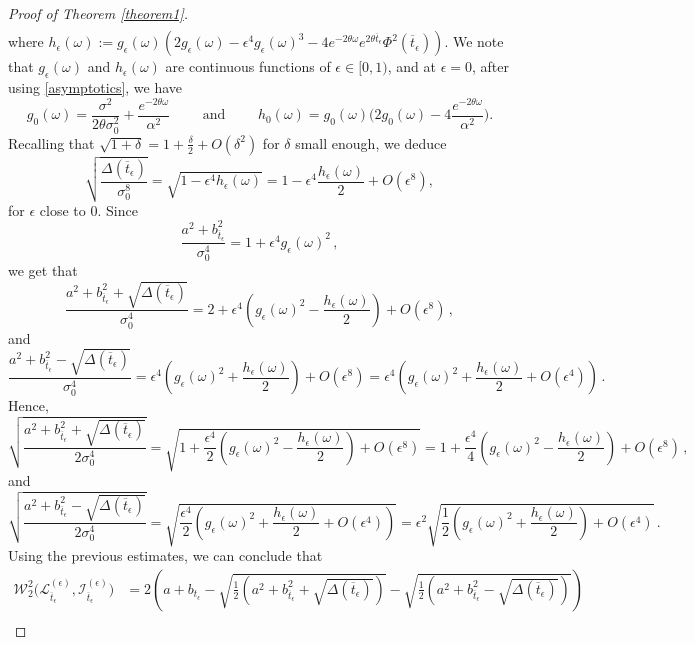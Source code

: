 \documentclass[12pt,thmsa]{article}
\begin{document}
\begin{proof}[Proof of Theorem \ref{theorem1}]
\[\begin{split}
	\end{split}
	\]
	where $h_\epsilon(\omega):=g_\epsilon(\omega)(2g_\epsilon(\omega)-\epsilon^4 g_\epsilon(\omega)^3-4 e^{-2\theta \omega}e^{2\theta \overline{t}_\epsilon}\Phi^2(\overline{t}_\epsilon))$.
	We note that $g_\epsilon(\omega)$ and $h_\epsilon(\omega)$ are continuous functions of $\epsilon\in[0,1)$, and at $\epsilon=0$, after using \eqref{asymptotics},  we have
	\begin{equation}\label{zero}
		g_0(\omega)=\frac{\sigma^2}{2\theta\sigma_0^2}+ \frac{e^{-2\theta \omega}}{\alpha^2}\qquad\mbox{ and }\qquad h_0(\omega)=g_0(\omega)\Big(2g_0(\omega)-4 \frac{e^{-2\theta \omega}}{\alpha^2}\Big).
	\end{equation}
	Recalling that $\sqrt{1+\delta}=1+\frac{\delta}{2}+O(\delta^2)$ for $\delta$ small enough, we deduce
	$$\sqrt{\frac{\Delta(\overline{t}_\epsilon)}{\sigma_0^8}}=\sqrt{1-\epsilon^4 h_\epsilon(\omega)}=1-\epsilon^4\frac{h_\epsilon(\omega)}{2}+O(\epsilon^8), $$
	for $\epsilon$ close to $0$. Since 
	$$\frac{a^2+b^2_{\overline{t}_\epsilon}}{\sigma_0^4}=1+\epsilon^4g_\epsilon(\omega)^2\,,$$
	we get that 
	$$\frac{a^2+b^2_{\overline{t}_\epsilon}+\sqrt{\Delta(\overline{t}_\epsilon)}}{\sigma_0^4}=2+\epsilon^4\left( g_\epsilon(\omega)^2-\frac{h_\epsilon(\omega)}{2}\right) +O(\epsilon^8)\,,$$
	and 
	$$\frac{a^2+b^2_{\overline{t}_\epsilon}-\sqrt{\Delta(\overline{t}_\epsilon)}}{\sigma_0^4}=\epsilon^4\left( g_\epsilon(\omega)^2+\frac{h_\epsilon(\omega)}{2}\right) +O(\epsilon^8)=\epsilon^4\left(  g_\epsilon(\omega)^2+\frac{h_\epsilon(\omega)}{2} +O(\epsilon^4)\right)\,.$$
	Hence,
	$$\sqrt{\frac{a^2+b^2_{\overline{t}_\epsilon}+\sqrt{\Delta(\overline{t}_\epsilon)}}{2\sigma_0^4}}=\sqrt{ 1+\frac{\epsilon^4}{2}\left( g_\epsilon(\omega)^2-\frac{h_\epsilon(\omega)}{2}\right)  +O(\epsilon^8)}=1+\frac{\epsilon^4}{4}\left( g_\epsilon(\omega)^2-\frac{h_\epsilon(\omega)}{2}\right) +O(\epsilon^8)\,,$$
	and 
	$$\sqrt{\frac{a^2+b^2_{\overline{t}_\epsilon}-\sqrt{\Delta(\overline{t}_\epsilon)}}{2\sigma_0^4}}=\sqrt{\frac{\epsilon^4}{2}\left(g_\epsilon(\omega)^2+\frac{h_\epsilon(\omega)}{2}+O(\epsilon^4)\right)}=\epsilon^2\sqrt{ \frac{1}{2}\left( g_\epsilon(\omega)^2+\frac{h_\epsilon(\omega)}{2}\right) +O(\epsilon^4)}\,.$$
	Using the previous estimates, we can conclude that 
	\[
	\begin{split}
		\mathcal{W}^2_2\Big(\mathcal{L}^{(\epsilon)}_{\overline{t}_\epsilon},\mathcal{I}^{(\epsilon)}_{\overline{t}_\epsilon}\Big)&=2\left(a+b_{t_\epsilon}-\sqrt{\frac{1}{2}\left(a^2+b^2_{\overline{t}_\epsilon}+ \sqrt{\Delta(\overline{t}_\epsilon)}\right)}-\sqrt{\frac{1}{2}\left(a^2+b^2_{\overline{t}_\epsilon}- \sqrt{\Delta(\overline{t}_\epsilon)}\right)}\right)\\

\end{split}\]
\end{proof}
\end{document}
